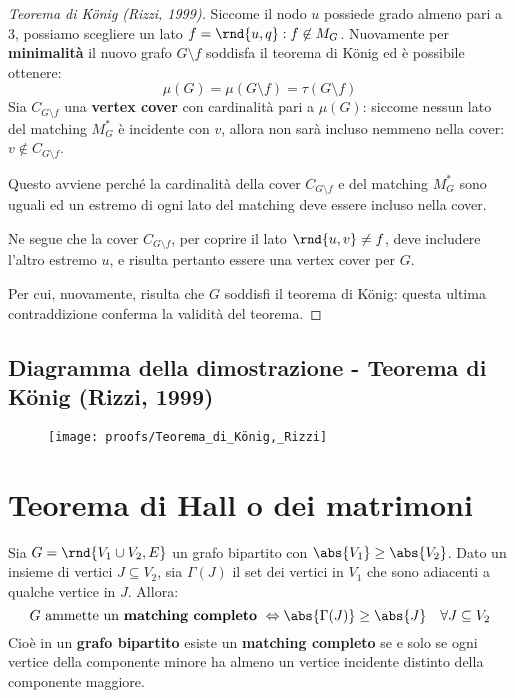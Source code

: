 \documentclass[\main/main.tex]{subfiles}
\begin{document}
\begin{proof}[Teorema di König (Rizzi, 1999)]
	Siccome il nodo \(u\) possiede grado almeno pari a \(3\), possiamo scegliere un lato \(f=\rnd{u,q}: f \not\in M_G\). Nuovamente per \textbf{minimalità} il nuovo grafo \(G\setminus f\) soddisfa il teorema di König ed è possibile ottenere:
	\[\mu(G) = \mu(G\setminus f) = \tau(G\setminus f)\]
	Sia \(C_{G\setminus f}\) una \textbf{vertex cover} con cardinalità pari a \(\mu(G)\): siccome nessun lato del matching \(M^*_G\) è incidente con \(v\), allora non sarà incluso nemmeno nella cover: \(v \not\in C_{G\setminus f}\).

	Questo avviene perché la cardinalità della cover \(C_{G\setminus f}\) e del matching \(M^*_G\) sono uguali ed un estremo di ogni lato del matching deve essere incluso nella cover.

	Ne segue che la cover \(C_{G\setminus f}\), per coprire il lato \(\rnd{u,v} \neq f\), deve includere l'altro estremo \(u\), e risulta pertanto essere una vertex cover per \(G\).

	Per cui, nuovamente, risulta che \(G\) soddisfi il teorema di König: questa ultima contraddizione conferma la validità del teorema.
\end{proof}
\clearpage
\subsection{Diagramma della dimostrazione - Teorema di König (Rizzi, 1999)}
\begin{figure}
	\texttt{[image: proofs/Teorema\_di\_König,\_Rizzi]}
\end{figure}
\clearpage
\section{Teorema di Hall o dei matrimoni}
\begin{theorem}
	Sia \(G = \rnd{V_1 \cup V_2, E}\) un grafo bipartito con \(\abs{V_1} \geq \abs{V_2}\). Dato un insieme di vertici \(J \subseteq V_2\), sia \(\Gamma(J) \) il set dei vertici in \(V_1\) che sono adiacenti a qualche vertice in \(J\). Allora:
	\[
		G \text{ ammette un \textbf{matching completo} } \Leftrightarrow \abs{\Gamma(J)} \geq \abs{J} \quad \forall J \subseteq V_2
	\]
	Cioè in un \textbf{grafo bipartito} esiste un \textbf{matching completo} se e solo se ogni vertice della componente minore ha almeno un vertice incidente distinto della componente maggiore.
\end{theorem}
\end{document}

